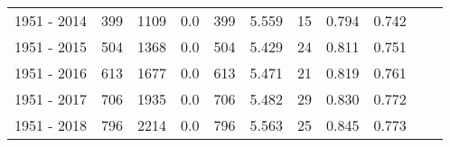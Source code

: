 \begin{tabular}{lrrrrrrrrrr}
1951 - 2014 &      399 &     1109 &    0.0 &   399 &       5.559 &             15 &       0.794 &             0.742 \\
1951 - 2015 &      504 &     1368 &    0.0 &   504 &       5.429 &             24 &       0.811 &             0.751 \\
1951 - 2016 &      613 &     1677 &    0.0 &   613 &       5.471 &             21 &       0.819 &             0.761 \\
1951 - 2017 &      706 &     1935 &    0.0 &   706 &       5.482 &             29 &       0.830 &             0.772 \\
1951 - 2018 &      796 &     2214 &    0.0 &   796 &       5.563 &             25 &       0.845 &             0.773 \\
\bottomrule
\end{tabular}
